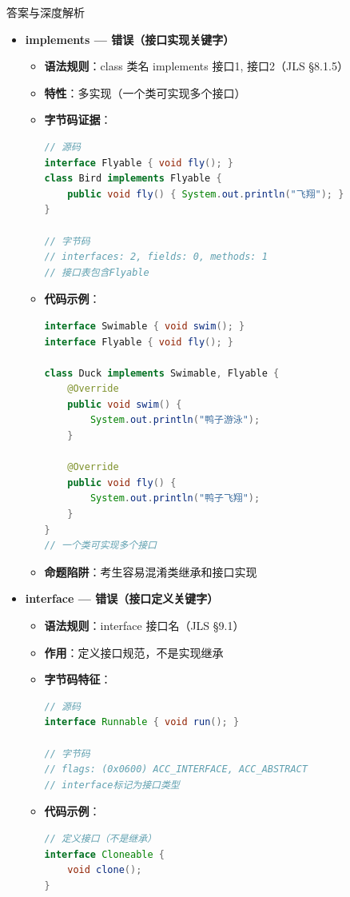 \documentclass[12pt, a4paper]{ctexart}
\begin{document}
\begin{enumerate}[label=\textbf{\arabic*.}]
\begin{bluebox}{答案与深度解析}
\begin{itemize}[leftmargin=*, nosep, label={}]
			      \item[B] \textbf{implements — 错误（接口实现关键字）}
			            \begin{itemize}[label={}, leftmargin=*, nosep]
				            \item \textbf{语法规则}：class 类名 implements 接口1, 接口2（JLS §8.1.5）
				            \item \textbf{特性}：多实现（一个类可实现多个接口）
				            \item \textbf{字节码证据}：
				                  \begin{lstlisting}[language=Java]
// 源码
interface Flyable { void fly(); }
class Bird implements Flyable {
    public void fly() { System.out.println("飞翔"); }
}

// 字节码
// interfaces: 2, fields: 0, methods: 1
// 接口表包含Flyable
				      \end{lstlisting}
				            \item \textbf{代码示例}：
				                  \begin{lstlisting}[language=Java]
interface Swimable { void swim(); }
interface Flyable { void fly(); }

class Duck implements Swimable, Flyable {
    @Override
    public void swim() {
        System.out.println("鸭子游泳");
    }

    @Override
    public void fly() {
        System.out.println("鸭子飞翔");
    }
}
// 一个类可实现多个接口
				      \end{lstlisting}
				            \item \textbf{命题陷阱}：考生容易混淆类继承和接口实现
			            \end{itemize}

			      \item[C] \textbf{interface — 错误（接口定义关键字）}
			            \begin{itemize}[label={}, leftmargin=*, nosep]
				            \item \textbf{语法规则}：interface 接口名（JLS §9.1）
				            \item \textbf{作用}：定义接口规范，不是实现继承
				            \item \textbf{字节码特征}：
				                  \begin{lstlisting}[language=Java]
// 源码
interface Runnable { void run(); }

// 字节码
// flags: (0x0600) ACC_INTERFACE, ACC_ABSTRACT
// interface标记为接口类型
				      \end{lstlisting}
				            \item \textbf{代码示例}：
				                  \begin{lstlisting}[language=Java]
// 定义接口（不是继承）
interface Cloneable {
    void clone();
}


\end{lstlisting}
\end{itemize}
\end{itemize}
\end{bluebox}
\end{enumerate}
\end{document}
